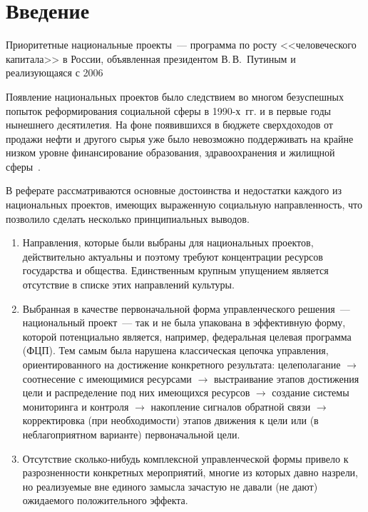 \documentclass[article, 12pt, russian, oneside]{ncc}
\begin{document}
 \thispagestyle{empty}
\tableofcontents
\newpage

\section*{Введение}

Приоритетные национальные проекты~--- программа по росту
<<человеческого капитала>> в России, объявленная президентом
В.\,В.~Путиным и реализующаяся с 2006

Появление национальных проектов было следствием во многом безуспешных
попыток реформирования социальной сферы в 1990-х~гг. и в первые годы
нынешнего десятилетия. На фоне появившихся в бюджете сверхдоходов от
продажи нефти и другого сырья уже было невозможно поддерживать на
крайне низком уровне финансирование образования, здравоохранения и
жилищной сферы~\cite{Spero}.

В реферате рассматриваются основные достоинства и недостатки каждого из
национальных проектов, имеющих выраженную социальную направленность,
что позволило сделать несколько принципиальных выводов.

\begin{enumerate}
\item Направления, которые были выбраны для национальных проектов,
  действительно актуальны и поэтому требуют концентрации ресурсов
  государства и общества. Единственным крупным упущением является
  отсутствие в списке этих направлений культуры.
\item Выбранная в качестве первоначальной форма управленческого
  решения~--- национальный проект~--- так и не была упакована в
  эффективную форму, которой потенциально является, например,
  федеральная целевая программа (ФЦП). Тем самым была нарушена
  классическая цепочка управления, ориентированного на достижение
  конкретного результата: целеполагание $\rightarrow$ соотнесение с
  имеющимися ресурсами $\rightarrow$ выстраивание этапов достижения
  цели и распределение под них имеющихся ресурсов $\rightarrow$
  создание системы мониторинга и контроля $\rightarrow$ накопление
  сигналов обратной связи $\rightarrow$ корректировка (при
  необходимости) этапов движения к цели или (в неблагоприятном
  варианте) первоначальной цели.
\item Отсутствие сколько-нибудь комплексной управленческой формы
  привело к разрозненности конкретных мероприятий, многие из которых
  давно назрели, но реализуемые вне единого замысла зачастую не
  давали (не дают) ожидаемого положительного эффекта.
\end{enumerate}
\end{document}
